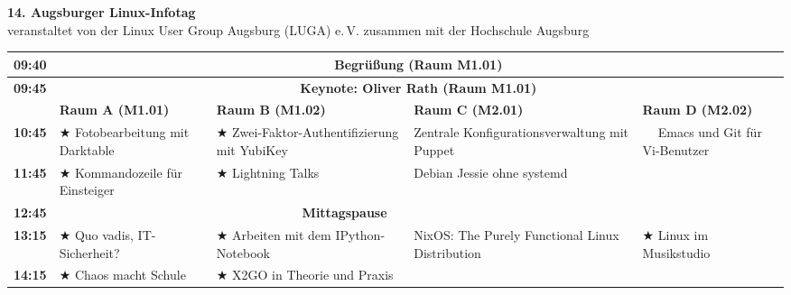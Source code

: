\documentclass[10pt,a4paper,ngerman]{scrartcl}
\begin{document}
\begin{landscape}
\sffamily

\begin{center}
     {\huge \textbf{14. Augsburger Linux-Infotag}}\\[2ex]
     veranstaltet von der Linux User Group Augsburg (LUGA) e.\,V. zusammen
     mit der Hochschule Augsburg
\end{center}

\vspace{2ex}


\begin{center}\small\begin{tabular}{|c||l|l|l|l|}\hline
    \bfseries{09:40} & \multicolumn{4}{c|}{\rule[-3mm]{0mm}{8mm}{\bfseries{Begrüßung} (Raum M1.01)}}  \\ \hline
    \bfseries{09:45} &
    \multicolumn{4}{c|}{\rule[-3mm]{0mm}{8mm}{\bfseries Keynote: Oliver Rath (Raum M1.01)}}\\ \hline
      & \rule[-3mm]{0mm}{8mm}
        \bfseries{Raum A (M1.01)} &
        \bfseries{Raum B (M1.02)} &
        \bfseries{Raum C (M2.01)} &
        \bfseries{Raum D (M2.02)} \\ \hline \hline  
    \bfseries{10:45} & \rule[-3mm]{0mm}{8mm}
      $\bigstar$ Fotobearbeitung mit Darktable &
      $\bigstar$ Zwei-Faktor-Authentifizierung mit YubiKey &
      Zentrale Konfigurationsverwaltung mit Puppet &
      \multirow{3}{*}{$\phantom{\bigstar}$ Emacs und Git für Vi-Benutzer} \\
      \cline{1-4}
    \bfseries{11:45} & \rule[-3mm]{0mm}{8mm}
      $\bigstar$ Kommandozeile für Einsteiger &
      $\bigstar$ Lightning Talks &
      Debian Jessie ohne systemd &
      \\ \hline
    \bfseries{12:45} & \multicolumn{4}{c|}{\rule[-3mm]{0mm}{8mm}{\bfseries{Mittagspause}} }\\ \hline
    \bfseries{13:15} & \rule[-3mm]{0mm}{8mm}
      $\bigstar$ Quo vadis, IT-Sicherheit? &
      $\bigstar$ Arbeiten mit dem IPython-Notebook &
      NixOS: The Purely Functional Linux Distribution &
      \multirow{3}{*}{$\bigstar$ Linux im Musikstudio}
      \\ \cline{1-4}
    \bfseries{14:15} & \rule[-3mm]{0mm}{8mm}
      $\bigstar$ Chaos macht Schule &
      $\bigstar$ X2GO in Theorie und Praxis &

\end{tabular}
\end{center}
\end{landscape}
\end{document}
